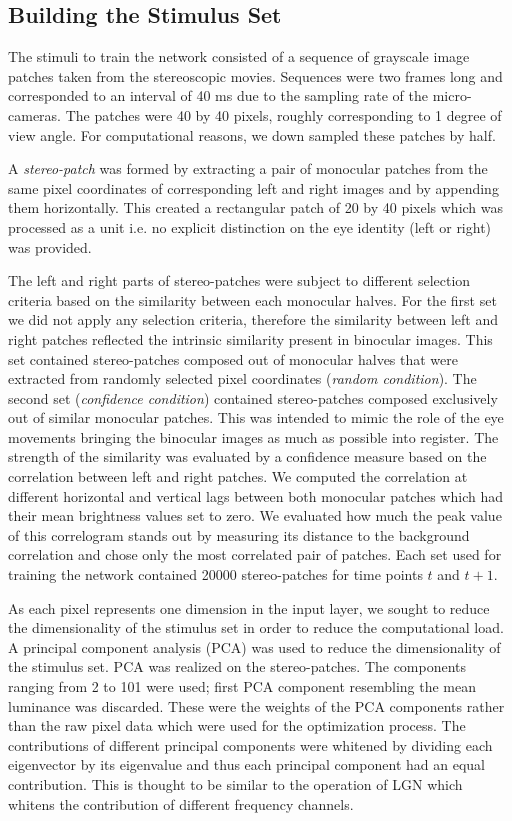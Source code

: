 \subsection{{Building the Stimulus Set}}

The stimuli to train the network consisted of a sequence of grayscale image
patches taken from the stereoscopic movies. Sequences were two frames long
and corresponded to an interval of 40 ms due to the sampling rate of the
micro-cameras. The patches were 40 by 40 pixels, roughly corresponding to 1
degree of view angle. For computational reasons, we down sampled these
patches by half. 


A \textit{stereo-patch} was formed by extracting a pair of monocular
patches from the same pixel coordinates of corresponding left and right
images and by appending them horizontally. This created a rectangular patch
of 20 by 40 pixels which was processed as a unit i.e. no explicit
distinction on the eye identity (left or right) was provided. 

The left and right parts of stereo-patches were subject to different
selection criteria based on the similarity between each monocular halves.
For the first set we did not apply any selection criteria, therefore the
similarity between left and right patches reflected the intrinsic
similarity present in binocular images. This set contained stereo-patches
composed out of monocular halves that were extracted from randomly selected
pixel coordinates (\textit{random condition}). The second set
(\textit{confidence condition}) contained stereo-patches composed
exclusively out of similar monocular patches. This was intended to mimic
the role of the eye movements bringing the binocular images as much as
possible into register. The strength of the similarity was evaluated by a
confidence measure based on the correlation between left and right patches.
We computed the correlation at different horizontal and vertical lags
between both monocular patches which had their mean brightness values set
to zero. We evaluated how much the peak value of this correlogram stands
out by measuring its distance to the background correlation and chose only
the most correlated pair of patches. Each set used for training the network
contained 20000 stereo-patches for time points $t$ and $t+1$. 


As each pixel represents one dimension in the input layer, we sought to
reduce the dimensionality of the stimulus set in order to reduce the
computational load. A principal component analysis (PCA)
 was used to reduce the
dimensionality of the stimulus set. PCA was realized on the stereo-patches.
The components ranging from 2 to 101 were used; first PCA component
resembling the mean luminance was discarded. These were the weights of the
PCA components rather than the raw pixel data which were used for the
optimization process. The contributions of different principal components
were whitened by dividing each eigenvector by its eigenvalue and thus each
principal component had an equal contribution. This is thought to be
similar to the operation of LGN \citep{dan1996a} which whitens the
contribution of different frequency channels.

